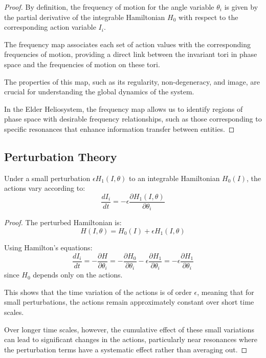 \begin{proof}
By definition, the frequency of motion for the angle variable $\theta_i$ is given by the partial derivative of the integrable Hamiltonian $H_0$ with respect to the corresponding action variable $I_i$.

The frequency map associates each set of action values with the corresponding frequencies of motion, providing a direct link between the invariant tori in phase space and the frequencies of motion on these tori.

The properties of this map, such as its regularity, non-degeneracy, and image, are crucial for understanding the global dynamics of the system.

In the Elder Heliosystem, the frequency map allows us to identify regions of phase space with desirable frequency relationships, such as those corresponding to specific resonances that enhance information transfer between entities.
\end{proof}

\subsection{Perturbation Theory}

\begin{theorem}
Under a small perturbation $\epsilon H_1(I, \theta)$ to an integrable Hamiltonian $H_0(I)$, the actions vary according to:
\begin{equation}
\frac{dI_i}{dt} = -\epsilon \frac{\partial H_1(I, \theta)}{\partial \theta_i}
\end{equation}
\end{theorem}

\begin{proof}
The perturbed Hamiltonian is:
\begin{equation}
H(I, \theta) = H_0(I) + \epsilon H_1(I, \theta)
\end{equation}

Using Hamilton's equations:
\begin{equation}
\frac{dI_i}{dt} = -\frac{\partial H}{\partial \theta_i} = -\frac{\partial H_0}{\partial \theta_i} - \epsilon \frac{\partial H_1}{\partial \theta_i} = -\epsilon \frac{\partial H_1}{\partial \theta_i}
\end{equation}
since $H_0$ depends only on the actions.

This shows that the time variation of the actions is of order $\epsilon$, meaning that for small perturbations, the actions remain approximately constant over short time scales.

Over longer time scales, however, the cumulative effect of these small variations can lead to significant changes in the actions, particularly near resonances where the perturbation terms have a systematic effect rather than averaging out.
\end{proof}

